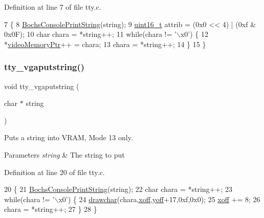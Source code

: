 Definition at line 7 of file tty.\+c.


\begin{DoxyCode}
7                                  \{
8     \hyperlink{a00041_a19e1f554d03c977f8b947f21489daa41_a19e1f554d03c977f8b947f21489daa41}{BochsConsolePrintString}(\textcolor{keywordtype}{string});
9     \hyperlink{a00095_a273cf69d639a59973b6019625df33e30_a273cf69d639a59973b6019625df33e30}{uint16\_t} attrib = (0x0 << 4) | (0xf & 0x0F);
10     \textcolor{keywordtype}{char} chara = *\textcolor{keywordtype}{string}++;
11     \textcolor{keywordflow}{while}(chara != \textcolor{stringliteral}{'\(\backslash\)x0'}) \{
12         *\hyperlink{a00113_a3f896e9c00b9302e2287aad054199134_a3f896e9c00b9302e2287aad054199134}{videoMemoryPtr}++ = chara;
13         chara = *\textcolor{keywordtype}{string}++;
14     \}
15 \}
\end{DoxyCode}
\mbox{\label{a00116_a13ff2c06d56753c5666ca56cb2d81100_a13ff2c06d56753c5666ca56cb2d81100}} 
\subsubsection{\texorpdfstring{tty\+\_\+vgaputstring()}{tty\_vgaputstring()}}
{\footnotesize\ttfamily void tty\+\_\+vgaputstring (\begin{DoxyParamCaption}\item[{char $\ast$}]{string }\end{DoxyParamCaption})}



Puts a string into V\+R\+AM, Mode 13 only. 


\begin{DoxyParams}{Parameters}
{\em string} & The string to put \\
\hline
\end{DoxyParams}


Definition at line 20 of file tty.\+c.


\begin{DoxyCode}
20                                     \{
21     \hyperlink{a00041_a19e1f554d03c977f8b947f21489daa41_a19e1f554d03c977f8b947f21489daa41}{BochsConsolePrintString}(\textcolor{keywordtype}{string});
22     \textcolor{keywordtype}{char} chara = *\textcolor{keywordtype}{string}++;
23     \textcolor{keywordflow}{while}(chara != \textcolor{stringliteral}{'\(\backslash\)x0'}) \{
24         \hyperlink{a00026_a2c8df7a20b47341b70d97a7ff21d86ea_a2c8df7a20b47341b70d97a7ff21d86ea}{drawchar}(chara,\hyperlink{a00113_abaa0d20f0e52ce0d3a7d706f6ac16266_abaa0d20f0e52ce0d3a7d706f6ac16266}{xoff},\hyperlink{a00113_a1a7539764d0ae8cd06ce45c62cf92bca_a1a7539764d0ae8cd06ce45c62cf92bca}{yoff}+17,0xf,0x0);
25         \hyperlink{a00113_abaa0d20f0e52ce0d3a7d706f6ac16266_abaa0d20f0e52ce0d3a7d706f6ac16266}{xoff} += 8;
26         chara = *\textcolor{keywordtype}{string}++;
27     \}
28 \}
\end{DoxyCode}
